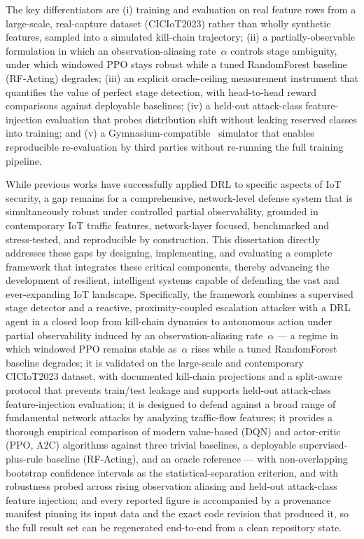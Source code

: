 The key differentiators are (i) training and evaluation on real feature rows from a large-scale, real-capture dataset (CICIoT2023) rather than wholly synthetic features, sampled into a simulated kill-chain trajectory; (ii) a partially-observable formulation in which an observation-aliasing rate~$\alpha$ controls stage ambiguity, under which windowed PPO stays robust while a tuned RandomForest baseline (RF-Acting) degrades; (iii) an explicit oracle-ceiling measurement instrument that quantifies the value of perfect stage detection, with head-to-head reward comparisons against deployable baselines; (iv) a held-out attack-class feature-injection evaluation that probes distribution shift without leaking reserved classes into training; and (v) a Gymnasium-compatible~\cite{Gymnasium2023} simulator that enables reproducible re-evaluation by third parties without re-running the full training pipeline.

While previous works have successfully applied DRL to specific aspects of IoT security, a gap remains for a comprehensive, network-level defense system that is simultaneously robust under controlled partial observability, grounded in contemporary IoT traffic features, network-layer focused, benchmarked and stress-tested, and reproducible by construction. This dissertation directly addresses these gaps by designing, implementing, and evaluating a complete framework that integrates these critical components, thereby advancing the development of resilient, intelligent systems capable of defending the vast and ever-expanding IoT landscape. Specifically, the framework combines a supervised stage detector and a reactive, proximity-coupled escalation attacker with a DRL agent in a closed loop from kill-chain dynamics to autonomous action under partial observability induced by an observation-aliasing rate~$\alpha$ --- a regime in which windowed PPO remains stable as~$\alpha$ rises while a tuned RandomForest baseline degrades; it is validated on the large-scale and contemporary CICIoT2023 dataset, with documented kill-chain projections and a split-aware protocol that prevents train/test leakage and supports held-out attack-class feature-injection evaluation; it is designed to defend against a broad range of fundamental network attacks by analyzing traffic-flow features; it provides a thorough empirical comparison of modern value-based (DQN) and actor-critic (PPO, A2C) algorithms against three trivial baselines, a deployable supervised-plus-rule baseline (RF-Acting), and an oracle reference --- with non-overlapping bootstrap confidence intervals as the statistical-separation criterion, and with robustness probed across rising observation aliasing and held-out attack-class feature injection; and every reported figure is accompanied by a provenance manifest pinning its input data and the exact code revision that produced it, so the full result set can be regenerated end-to-end from a clean repository state.
